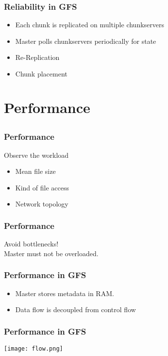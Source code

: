 \documentclass[notes=hide,yellow]{beamer}
\begin{document}
\begin{frame}
	\frametitle{Reliability in GFS}
	
	\begin{itemize}
		\item Each chunk is replicated on multiple chunkservers
		\item Master polls chunkservers periodically for state 	
		\item Re-Replication
		\item Chunk placement
	\end{itemize}

\end{frame}




\section{Performance}
\subsection*{}
\begin{frame}
	\frametitle{Performance}
	Observe the workload
	\begin{itemize}
		\item Mean file size %
		\item Kind of file access %
		\item Network topology %
	\end{itemize}		
\end{frame}


\begin{frame}
	\frametitle{Performance}
	Avoid bottlenecks!\\
	
	Master must not be overloaded.
\end{frame}

\begin{frame}
	\frametitle{Performance in GFS}
	\begin{itemize}
		\item Master stores metadata in RAM.	
		\item Data flow is decoupled from control flow
	\end{itemize}
\end{frame}

\begin{frame}
	\frametitle{Performance in GFS}
	\texttt{[image: flow.png]}
\end{frame}
\end{document}
